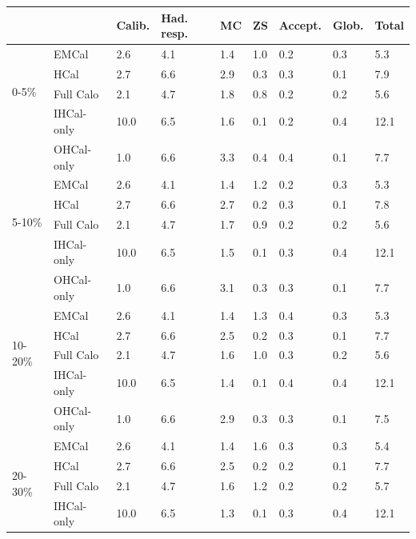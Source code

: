 \begin{table}
\centering
\begin{tabular}{ |p{1.3cm}|p{2.1cm}|p{1.0cm}|p{1.0cm}|p{1.0cm}|p{1.0cm}|p{1.3cm}|p{1.0cm}|p{1.0cm}|  }
\hline
& & \raggedright Calib. & \raggedright Had. resp. & \raggedright MC & ZS & Accept. & Glob. & Total \\
\hline
\multirow{4}{*}{0-5\%} & EMCal   & 2.6  & 4.1 & 1.4 & 1.0 & 0.2 & 0.3 & 5.3 \\
& HCal                           & 2.7  & 6.6 & 2.9 & 0.3 & 0.3 & 0.1 & 7.9 \\
& Full Calo                      & 2.1  & 4.7 & 1.8 & 0.8 & 0.2 & 0.2 & 5.6 \\
& IHCal-only                     & 10.0 & 6.5 & 1.6 & 0.1 & 0.2 & 0.4 & 12.1 \\
& OHCal-only                     & 1.0  & 6.6 & 3.3 & 0.4 & 0.4 & 0.1 & 7.7 \\
\hline
\multirow{4}{*}{5-10\%}& EMCal   & 2.6  & 4.1 & 1.4 & 1.2 & 0.2 & 0.3 & 5.3 \\
& HCal                           & 2.7  & 6.6 & 2.7 & 0.2 & 0.3 & 0.1 & 7.8 \\
& Full Calo                      & 2.1  & 4.7 & 1.7 & 0.9 & 0.2 & 0.2 & 5.6 \\
& IHCal-only                     & 10.0 & 6.5 & 1.5 & 0.1 & 0.3 & 0.4 & 12.1 \\
& OHCal-only                     & 1.0  & 6.6 & 3.1 & 0.3 & 0.3 & 0.1 & 7.7 \\
\hline
\multirow{4}{*}{10-20\%}& EMCal  & 2.6  & 4.1 & 1.4 & 1.3 & 0.4 & 0.3 & 5.3 \\
& HCal                           & 2.7  & 6.6 & 2.5 & 0.2 & 0.3 & 0.1 & 7.7 \\
& Full Calo                      & 2.1  & 4.7 & 1.6 & 1.0 & 0.3 & 0.2 & 5.6 \\
& IHCal-only                     & 10.0 & 6.5 & 1.4 & 0.1 & 0.4 & 0.4 & 12.1 \\
& OHCal-only                     & 1.0  & 6.6 & 2.9 & 0.3 & 0.3 & 0.1 & 7.5 \\
\hline
\multirow{4}{*}{20-30\%}& EMCal  & 2.6  & 4.1 & 1.4 & 1.6 & 0.3 & 0.3 & 5.4 \\
& HCal                           & 2.7  & 6.6 & 2.5 & 0.2 & 0.2 & 0.1 & 7.7 \\
& Full Calo                      & 2.1  & 4.7 & 1.6 & 1.2 & 0.2 & 0.2 & 5.7 \\
& IHCal-only                     & 10.0 & 6.5 & 1.3 & 0.1 & 0.3 & 0.4 & 12.1 \\

\end{tabular}
\end{table}
